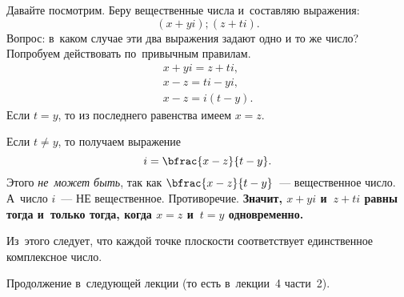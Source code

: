 Давайте посмотрим. Беру вещественные числа и~составляю выражения:
$$
(x+yi); (z+ti).
$$
Вопрос: в~каком случае эти два выражения задают одно и то же число?
Попробуем действовать по~привычным правилам.
\begin{gather*}
x+yi=z+ti,\\
x-z=ti-yi,\\
x-z=i(t-y).
\end{gather*}
Если $t=y$, то из последнего равенства имеем $x=z$.

Если $t\ne y$, то получаем выражение
$$
i=\bfrac{x-z}{t-y}.
$$
Этого \textit{не~может быть}, так как $\bfrac{x-z}{t-y}$~--- вещественное число. А~число $i$~--- НЕ вещественное. Противоречие.
\textbf{Значит, $x+yi$ и~$z+ti$ равны тогда и~только тогда, когда $x=z$ и~$t=y$ одновременно.}

Из~этого следует, что каждой точке плоскости соответствует единственное комплексное число.

Продолжение в~следующей лекции (то есть в~лекции~4 части~2).

\endinput
